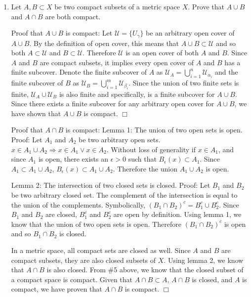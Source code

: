 \documentclass[12pt,letterpaper,reqno]{amsart}
\begin{document}
\begin{enumerate}[1.]
\begin{flushleft}
\end{flushleft}
\item Let $A, B\subset X$ be two compact subsets of a metric space $X$. Prove that $A\cup B$ and $A\cap B$ are both compact.
\vspace{.15in}
\begin{flushleft}
Proof that $A\cup B$ is compact:\newline
Let $\mathcal{U} = \{U_\gamma\}$ be an arbitrary open cover of $A \cup B$. By the definition of open cover, this means that $A \cup B \subset \mathcal{U}$ and so both $A \subset \mathcal{U}$ and $B \subset \mathcal{U}$. Therefore $\mathcal{U}$ is an open cover of both $A$ and $B$. Since $A$ and $B$ are compact subsets, it implies every open cover of $A$ and $B$ has a finite subcover. Denote the finite subcover of $A$ as $\mathcal{U}_A = \bigcup\limits_{i=1}^n \mathcal{U}_{\alpha_i}$ and the finite subcover of $B$ as $\mathcal{U}_B = \bigcup\limits_{i=1}^m \mathcal{U}_{\beta_i}$. Since the union of two finite sets is finite, $\mathcal{U}_A \cup \mathcal{U}_B$ is also finite and specifically, is a finite subcover for $A \cup B$. Since there exists a finite subcover for any arbitrary open cover for $A \cup B$, we have shown that $A \cup B$ is compact. $\Box$\newline

Proof that $A\cap B$ is compact:\newline
Lemma 1: The union of two open sets is open.\newline
Proof: Let $A_1$ and $A_2$ be two arbitrary open sets. $x \in A_1 \cup A_2 \Rightarrow x \in A_1 \vee x \in A_2$. Without loss of generality if $x \in A_1$, and since $A_1$ is open, there exists an $\epsilon > 0$ such that $B_\epsilon(x) \subset A_1$. Since $A_1 \subset A_1 \cup A_2$, $B_\epsilon(x) \subset A_1 \cup A_2$. Therefore the union $A_1 \cup A_2$ is open.\newline

Lemma 2: The intersection of two closed sets is closed.\newline
Proof: Let $B_1$ and $B_2$ be two arbitrary closed set. The complement of the intersection is equal to the union of the complements. Symbolically, $(B_1 \cap B_2)^c = B_1^c \cup B_2^c$. Since $B_1$ and $B_2$ are closed, $B_1^c$ and $B_2^c$ are open by definition. Using lemma 1, we know that the union of two open sets is open. Therefore $(B_1 \cap B_2)^c$ is open and so $B_1 \cap B_2$ is closed.\newline

In a metric space, all compact sets are closed as well. Since $A$ and $B$ are compact subsets, they are also closed subsets of $X$. Using lemma 2, we know that $A \cap B$ is also closed. From \#5 above, we know that the closed subset of a compact space is compact. Given that $A \cap B \subset A$, $A \cap B$ is closed, and $A$ is compact, we have proven that $A \cap B$ is compact. $\Box$\newline


\end{flushleft}
\end{enumerate}
\end{document}
